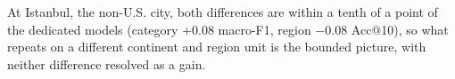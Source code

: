 
At Istanbul, the non-U.S. city, both differences are within a tenth of a point of the dedicated
models (category $+0.08$ macro-F1, region $-0.08$ Acc@10), so what repeats on a different continent
and region unit is the bounded picture, with neither difference resolved as a gain.
